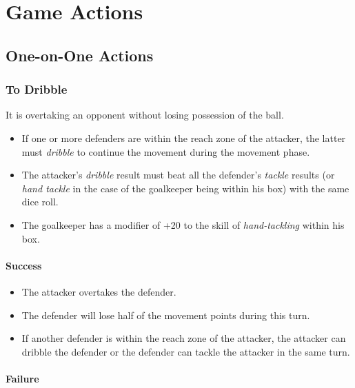 \documentclass[12pt]{article}
\begin{document}
\clearpage
\clearpage
\section{\textbf{Game Actions}}

\subsection{\textbf{One-on-One Actions}}

\subsubsection{To Dribble}
It is overtaking an opponent without losing possession of the ball.

\begin{rulebox}
\begin{itemize}
\item If one or more defenders are within the reach zone of the attacker, the latter must \emph{dribble }to continue the movement during the movement phase.
\item The attacker's \emph{dribble }result must beat all the defender's \emph{tackle }results (or \emph{hand tackle} in the case of the goalkeeper being within his box) with the same dice roll.
\item The goalkeeper has a modifier of +20 to the skill of \emph{hand-tackling} within his box.
\end{itemize}
\end{rulebox}

\paragraph{Success}

\begin{rulebox}
\begin{itemize}
\item The attacker overtakes the defender.
\item The defender will lose half of the movement points during this turn.
\item If another defender is within the reach zone of the attacker, the attacker can dribble the defender or the defender can tackle the attacker in the same turn.
\end{itemize}
\end{rulebox}

\paragraph{Failure}
\end{document}

